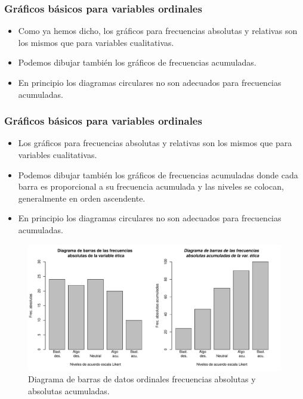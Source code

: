 \begin{frame}
\frametitle{Gráficos básicos para variables ordinales}

\begin{itemize}
\item Como ya hemos dicho, los gráficos para frecuencias absolutas y relativas son los mismos que para variables cualitativas.
\item Podemos dibujar también los gráficos de frecuencias acumuladas.
\item En principio los diagramas circulares no son adecuados para frecuencias acumuladas.
\end{itemize}


\end{frame}

\begin{frame}
\frametitle{Gráficos básicos para variables ordinales}

\begin{itemize}
\item Los gráficos para frecuencias absolutas y relativas son los mismos que para variables cualitativas.
\item Podemos dibujar también los gráficos de frecuencias acumuladas donde cada barra es proporcional a su frecuencia acumulada y las niveles se colocan, generalmente en orden ascendente. 
\item En principio los diagramas circulares no son adecuados para frecuencias acumuladas.
\end{itemize}


\end{frame}

\begin{frame}
\begin{figure}
\begin{center} 
\includegraphics{./dibujos/01/-004}
\caption{Diagrama de barras de datos ordinales frecuencias absolutas y absolutas acumuladas.}
\end{center}
\end{figure} 
\end{frame}


